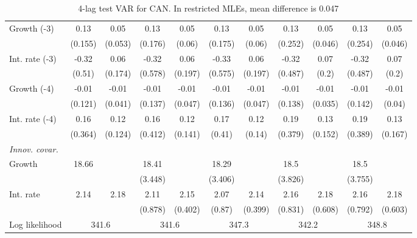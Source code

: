 \begin{table}[htbp]
\begin{tabular}{@{\extracolsep{4pt}}lcccccccccc@{}}
\quad Growth (-3) 	 &0.13 	 & 0.05 	 & 0.13 	 & 0.05 	 & 0.13 	 & 0.05 	 & 0.13 	 & 0.05 	 & 0.13 	 & 0.05	 \\ 
 		 & (0.155) 	 & (0.053) 	 & (0.176) 	 & (0.06) 	 & (0.175) 	 & (0.06) 	 & (0.252) 	 & (0.046) 	 & (0.254) 	 & (0.046) 	 \\ 
\quad Int. rate (-3) 	 &-0.32 	 & 0.06 	 & -0.32 	 & 0.06 	 & -0.33 	 & 0.06 	 & -0.32 	 & 0.07 	 & -0.32 	 & 0.07	 \\ 
 		 & (0.51) 	 & (0.174) 	 & (0.578) 	 & (0.197) 	 & (0.575) 	 & (0.197) 	 & (0.487) 	 & (0.2) 	 & (0.487) 	 & (0.2) 	 \\ 
\quad Growth (-4) 	 &-0.01 	 & -0.01 	 & -0.01 	 & -0.01 	 & -0.01 	 & -0.01 	 & -0.01 	 & -0.01 	 & -0.01 	 & -0.01	 \\ 
 		 & (0.121) 	 & (0.041) 	 & (0.137) 	 & (0.047) 	 & (0.136) 	 & (0.047) 	 & (0.138) 	 & (0.035) 	 & (0.142) 	 & (0.04) 	 \\ 
\quad Int. rate (-4) 	 &0.16 	 & 0.12 	 & 0.16 	 & 0.12 	 & 0.17 	 & 0.12 	 & 0.19 	 & 0.13 	 & 0.19 	 & 0.13	 \\ 
 		 & (0.364) 	 & (0.124) 	 & (0.412) 	 & (0.141) 	 & (0.41) 	 & (0.14) 	 & (0.379) 	 & (0.152) 	 & (0.389) 	 & (0.167) 	 \\ 
\rule{0pt}{4ex} \emph{Innov. covar.}  	 & 	 & 	 & 	 & 	 & 	 & 	 & 	 & 	 & 	 &\\ 
\quad Growth 	 &18.66 	 &  	 & 18.41 	 &  	 & 18.29 	 &  	 & 18.5 	 &  	 & 18.5 	 & 	 \\ 
 		 &  	 &  	 & (3.448) 	 &  	 & (3.406) 	 &  	 & (3.826) 	 &  	 & (3.755) 	 &  	 \\ 
\quad Int. rate 	 &2.14 	 & 2.18 	 & 2.11 	 & 2.15 	 & 2.07 	 & 2.14 	 & 2.16 	 & 2.18 	 & 2.16 	 & 2.18	 \\ 
 		 &  	 &  	 & (0.878) 	 & (0.402) 	 & (0.87) 	 & (0.399) 	 & (0.831) 	 & (0.608) 	 & (0.792) 	 & (0.603) 	 \\ 
 \hline \rule{0pt}{4ex} 
  Log likelihood 	 &\multicolumn{2}{c}{341.6} 	 & \multicolumn{2}{c}{341.6} 	 & \multicolumn{2}{c}{347.3} 	 & \multicolumn{2}{c}{342.2} 	 & \multicolumn{2}{c}{348.8}\\ 

 \hline 	\end{tabular}		\caption{4-lag test VAR for CAN. In restricted MLEs, mean difference is 0.047}
		\label{tab:CAN4lag}

\end{table}